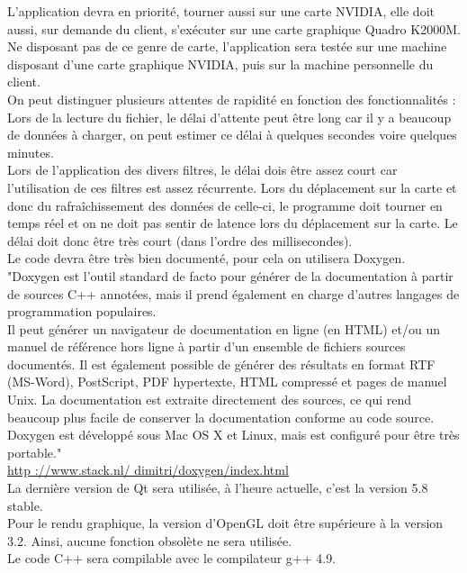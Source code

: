\documentclass[12pt]{article}
\begin{document}
		L’application devra en priorité, tourner aussi sur une carte NVIDIA, elle doit aussi,
		sur demande du client, s’exécuter sur une carte graphique Quadro K2000M. Ne 
		disposant pas de ce genre de carte, l'application sera testée sur une machine 
		disposant d'une carte graphique NVIDIA, puis sur la machine personnelle du client. \\
		
		On peut distinguer plusieurs attentes de rapidité en fonction des fonctionnalités :
		Lors de la lecture du fichier, le délai d’attente peut être long car il y a
		beaucoup de données à charger, on peut estimer ce délai à quelques secondes voire
		quelques minutes. \\
		
		Lors de l’application des divers filtres, le délai dois être assez court car l'utilisation
		de ces filtres est assez récurrente.
		Lors du déplacement sur la carte et donc du rafraîchissement des données de celle-ci,
		le programme doit tourner en temps réel et on ne doit pas sentir de latence lors du
		déplacement sur la carte. Le délai doit donc être très court (dans l’ordre des
		millisecondes).\\
		Le code devra être très bien documenté, pour cela on utilisera Doxygen.
		"Doxygen est l’outil standard de facto pour générer de la documentation à partir de
		sources C++ annotées, mais il prend également en charge d’autres langages de
		programmation populaires.\\
		Il peut générer un navigateur de documentation en ligne (en HTML) et/ou un manuel de
		référence hors ligne à partir d’un ensemble de fichiers sources documentés. Il est
		également possible de générer des résultats en format RTF (MS-Word), PostScript,
		PDF hypertexte, HTML compressé et pages de manuel Unix. La documentation est 
		extraite directement des sources, ce qui rend beaucoup plus facile de conserver
		la documentation conforme au code source. \\
		Doxygen est développé sous Mac OS X et Linux, mais est configuré pour être très
		portable."\\
		
		\url{http ://www.stack.nl/ dimitri/doxygen/index.html} \\
		
		La dernière version de Qt sera utilisée, à l’heure actuelle, c’est la version
		5.8 stable.\\
		Pour le rendu graphique, la version d’OpenGL doit être supérieure à la version 3.2.
		Ainsi, aucune fonction obsolète ne sera utilisée.\\
		Le code C++ sera compilable avec le compilateur g++ 4.9.
		
\end{document}
